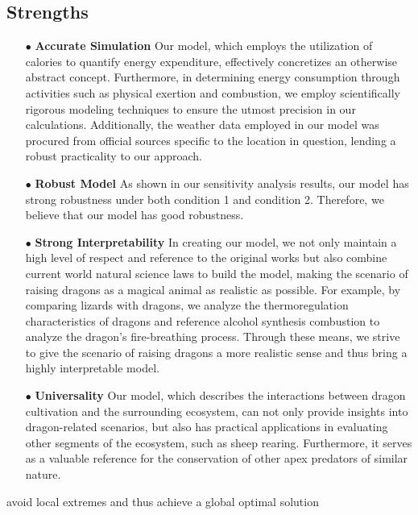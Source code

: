 \documentclass[12pt]{article}  %
\begin{document}
\subsection{Strengths}
\vspace{-0.3cm}
\begin{itemize}
\item[$\bullet$] \textbf{Accurate Simulation }Our model, which employs the utilization of calories to quantify energy expenditure, effectively concretizes an otherwise abstract concept. Furthermore, in determining energy consumption through activities such as physical exertion and combustion, we employ scientifically rigorous modeling techniques to ensure the utmost precision in our calculations. Additionally, the weather data employed in our model was procured from official sources specific to the location in question, lending a robust practicality to our approach.

\item[$\bullet$] \textbf{Robust Model }As shown in our sensitivity analysis results, our model has strong robustness under both condition 1 and condition 2. Therefore, we believe that our model has good robustness.

\item[$\bullet$] \textbf{Strong Interpretability }In creating our model, we not only maintain a high level of respect and reference to the original works but also combine current world natural science laws to build the model, making the scenario of raising dragons as a magical animal as realistic as possible. For example, by comparing lizards with dragons, we analyze the thermoregulation characteristics of dragons and reference alcohol synthesis combustion to analyze the dragon's fire-breathing process. Through these means, we strive to give the scenario of raising dragons a more realistic sense and thus bring a highly interpretable model.

\item[$\bullet$] \textbf{Universality } Our model, which describes the interactions between dragon cultivation and the surrounding ecosystem, can not only provide insights into dragon-related scenarios, but also has practical applications in evaluating other segments of the ecosystem, such as sheep rearing. Furthermore, it serves as a valuable reference for the conservation of other apex predators of similar nature.
\end{itemize}

 avoid local extremes and thus achieve a global optimal solution
\end{document}
